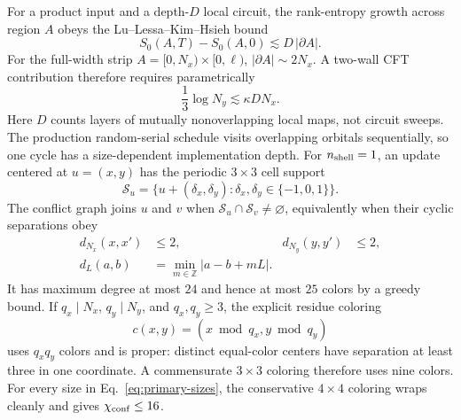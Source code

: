 \documentclass[aps,prx,twocolumn,floatfix,nofootinbib,superscriptaddress,longbibliography]{revtex4-2}
\begin{document}
For a product input and a depth-$D$ local circuit, the rank-entropy growth across region $A$
obeys the Lu--Lessa--Kim--Hsieh bound~\cite{LuLessaKimHsieh2022}
\begin{equation}
 S_0(A,T)-S_0(A,0)\lesssim D\,|\partial A|.
 \label{eq:lu-bound}
\end{equation}
For the full-width strip $A=[0,N_x)\times[0,\ell)$,
$|\partial A|\sim2N_x$.  A two-wall CFT contribution therefore requires parametrically
\begin{equation}
 \frac13\log N_y\lesssim \kappa D N_x.
 \label{eq:lu-cft}
\end{equation}
Here $D$ counts layers of mutually nonoverlapping local maps, not circuit sweeps.  The
production random-serial schedule visits overlapping orbitals sequentially, so one cycle
has a size-dependent implementation depth.  For $n_{\rm shell}=1$, an update centered at
$u=(x,y)$ has the periodic $3\times3$ cell support
\begin{equation}
 \mathcal S_u=\{u+(\delta_x,\delta_y):\delta_x,\delta_y\in\{-1,0,1\}\}.
\end{equation}
The conflict graph joins $u$ and $v$ when $\mathcal S_u\cap\mathcal S_v\ne\varnothing$,
equivalently when their cyclic separations obey
\begin{equation}
 \begin{aligned}
 d_{N_x}(x,x')&\le2,& d_{N_y}(y,y')&\le2,\\
 d_L(a,b)&=\min_{m\in\mathbb Z}|a-b+mL|.
 \end{aligned}
\end{equation}
It has maximum degree at most $24$ and hence at most $25$ colors by a greedy bound.  If
$q_x\mid N_x$, $q_y\mid N_y$, and $q_x,q_y\ge3$, the explicit residue coloring
\begin{equation}
 c(x,y)=(x\bmod q_x,y\bmod q_y)
 \label{eq:residue-coloring}
\end{equation}
uses $q_xq_y$ colors and is proper: distinct equal-color centers have separation at least
three in one coordinate.  A commensurate $3\times3$ coloring therefore uses nine colors.
For every size in Eq.~\eqref{eq:primary-sizes}, the conservative $4\times4$ coloring wraps
cleanly and gives $\chi_{\rm conf}\le16$.
\end{document}
